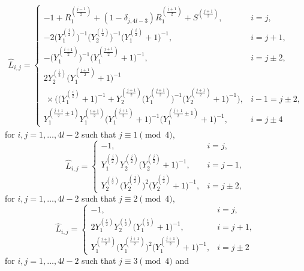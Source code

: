 \documentclass[10pt,a4paper]{amsart}
\numberwithin{equation}{section}
\begin{document}
	\begin{gather*}\hat{L}_{i,j}=\begin{cases}
		-1+R_1^{(\frac{j-1}{2})}+(1-\delta_{j,4l-3})R_1^{(\frac{j+1}{2})}+S^{(\frac{j+1}{2})},&i=j,\\
		-2\bigl(Y_1^{(\frac{i}{2})}\bigr)^{-1}\bigl(Y_2^{(\frac{i}{2})}\bigr)^{-1}\bigl(Y_1^{(\frac{i}{2})}+1\bigr)^{-1},&i=j+1,\\
		-\bigl(Y_1^{(\frac{i+1}{2})}\bigr)^{-1}\bigl(Y_1^{(\frac{j+1}{2})}+1\bigr)^{-1},&i=j\pm2,\\
2Y_2^{(\frac{i}{2})}\bigl(Y_1^{(\frac{j+1}{2})}+1\bigr)^{-1} \\
\ \times \bigl(\bigl(Y_1^{(\frac{i}{2})}+1\bigr)^{-1}+Y_2^{(\frac{j+1}{2})}\bigl(Y_1^{(\frac{j+1}{2})}\bigr)^{-1}\bigl(Y_2^{(\frac{j+1}{2})}+1\bigr)^{-1}\bigr),&i-1=j\pm2,\\
		Y_1^{(\frac{j+1}{2}\pm1)}Y_1^{(\frac{i+1}{2})}\bigl(Y_1^{(\frac{j+1}{2})}+1\bigr)^{-1}\bigl(Y_1^{(\frac{j+1}{2}\pm1)}+1\bigr)^{-1},& i=j\pm4
	\end{cases}\end{gather*}
for $i,j=1,\dots,4l-2$ such that $j\equiv1\pmod{4}$,
	\[\hat{L}_{i,j}=\begin{cases}
		-1,& i=j,\\
		Y_1^{(\frac{j}{2})}Y_2^{(\frac{j}{2})}\bigl(Y_2^{(\frac{j}{2})}+1\bigr)^{-1},& i=j-1,\\
		Y_2^{(\frac{i}{2})}\bigl(Y_2^{(\frac{j}{2})}\bigr)^2\bigl(Y_2^{(\frac{j}{2})}+1\bigr)^{-1},& i=j\pm2,
	\end{cases}\]
for $i,j=1,\dots,4l-2$ such that $j\equiv2\pmod{4}$,
	\[\hat{L}_{i,j}=\begin{cases}
		-1,& i=j,\\
		2Y_1^{(\frac{i}{2})}Y_2^{(\frac{i}{2})}\bigl(Y_1^{(\frac{i}{2})}+1\bigr)^{-1},& i=j+1,\\
		Y_1^{(\frac{i+1}{2})}\bigl(Y_1^{(\frac{j+1}{2})}\bigr)^2\bigl(Y_1^{(\frac{j+1}{2})}+1\bigr)^{-1},& i=j\pm2
	\end{cases}\]
for $i,j=1,\dots,4l-2$ such that $j\equiv3\pmod{4}$ and
\end{document}

